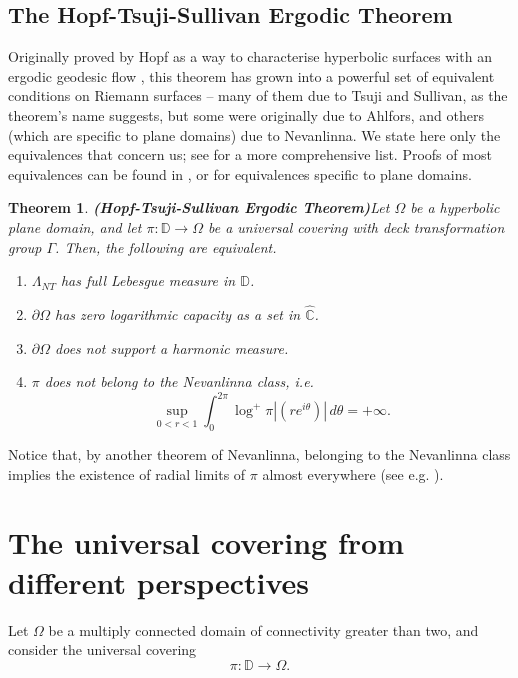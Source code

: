 \documentclass[11pt,a4paper,reqno]{amsart}
\theoremstyle{plain}
\newtheorem{thm}{Theorem}[section]
\theoremstyle{definition}
\theoremstyle{plain}
\def\DD{\mathbb{D}}
\begin{document}
\subsection*{The Hopf-Tsuji-Sullivan Ergodic Theorem}
Originally proved by Hopf as a way to characterise hyperbolic surfaces with an ergodic geodesic flow \cite{Hop36}, this theorem has grown into a powerful set of equivalent conditions on Riemann surfaces -- many of them due to Tsuji and Sullivan, as the theorem's name suggests, but some were originally due to Ahlfors, and others (which are specific to plane domains) due to Nevanlinna. We state here only the equivalences that concern us; see \cite{Fer89} for a more comprehensive list. Proofs of most equivalences can be found in \cite[Chap. 11]{Tsu75}, or \cite[Chap. VII.5]{Nev70} for equivalences specific to plane domains.
\begin{thm}{\bf (Hopf-Tsuji-Sullivan Ergodic Theorem)}\label{thm-hopf-tsuji-sullivan}
Let $\Omega$ be a hyperbolic plane domain, and let $\pi\colon\DD\to\Omega$ be a universal covering with deck transformation group $\Gamma$. Then, the following are equivalent.
\begin{enumerate}[label={\normalfont (\alph*)}]
	\item $\Lambda_{NT}$ has full Lebesgue measure in $\DD$.
	\item $\partial\Omega$ has zero logarithmic capacity as a set in $ \widehat{\mathbb{C}} $.
	\item $\partial\Omega$ does not support a harmonic measure.
	\item $\pi$ does not belong to the Nevanlinna class, i.e.
	\[ \sup_{0 < r < 1} \int_0^{2\pi} \log^+\pi|(re^{i\theta})|\,d\theta = +\infty. \]
\end{enumerate}
\end{thm}

Notice that, by another theorem of Nevanlinna, belonging to the Nevanlinna class implies the existence of radial limits of $\pi$ almost everywhere (see e.g. \cite[Thm. 20.2.11]{Conway2}).

\section{The universal covering from different perspectives}\label{sect-main-result}
Let $ \Omega $ be a multiply connected domain of connectivity greater than two, and consider the universal covering\[\pi\colon\mathbb{D}\longrightarrow \Omega.\]
\end{document}
